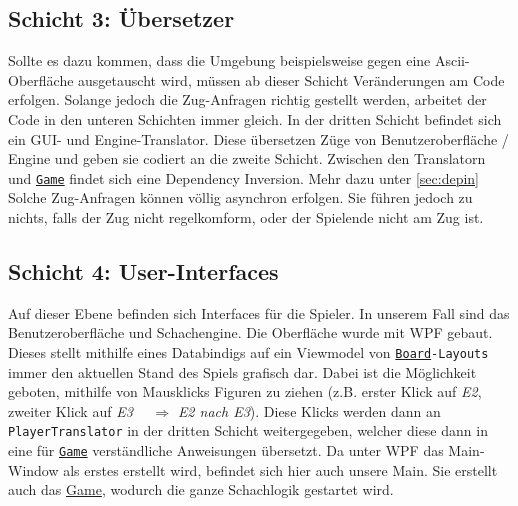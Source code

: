 \documentclass[
10pt, %
a4paper, %
oneside, %
headinclude,footinclude, %
BCOR5mm, %
]{scrartcl}
\begin{document}
\begin{onehalfspace}
\subsection{Schicht 3: Übersetzer}
Sollte es dazu kommen, dass die Umgebung beispielsweise gegen eine Ascii-Oberfläche ausgetauscht wird, müssen ab dieser Schicht Veränderungen am Code erfolgen. Solange jedoch die Zug-Anfragen richtig gestellt werden, arbeitet der Code in den unteren Schichten immer gleich. In der dritten Schicht befindet sich ein GUI- und Engine-Translator. Diese übersetzen Züge von Benutzeroberfläche / Engine und geben sie codiert an die zweite Schicht. Zwischen den Translatorn und \texttt{\href{https://github.com/schmida736/Chess-AdvancedSE/blob/main/Chess-AdvancedSE/Game\%20Elements/Game.cs}{Game}} findet sich eine Dependency Inversion. Mehr dazu unter \autoref{sec:depin}
Solche Zug-Anfragen können völlig asynchron erfolgen. Sie führen jedoch zu nichts, falls der Zug nicht regelkomform, oder der Spielende nicht am Zug ist.
\subsection{Schicht 4: User-Interfaces}
Auf dieser Ebene befinden sich Interfaces für die Spieler. In unserem Fall sind das Benutzeroberfläche und Schachengine. Die Oberfläche wurde mit WPF gebaut. Dieses stellt mithilfe eines Databindigs auf ein Viewmodel von \texttt{\href{https://github.com/schmida736/Chess-AdvancedSE/blob/main/Chess-AdvancedSE/Game\%20Elements/Board.cs}{Board}-Layouts} immer den aktuellen Stand des Spiels grafisch dar. 
Dabei ist die Möglichkeit geboten, mithilfe von Mausklicks Figuren zu ziehen (z.B. erster Klick auf \textit{E2}, zweiter Klick auf \textit{E3}~~ $\Rightarrow$ \textit{E2 nach E3}). Diese Klicks werden dann an \texttt{PlayerTranslator} in der dritten Schicht weitergegeben, welcher diese dann in eine für \texttt{\href{https://github.com/schmida736/Chess-AdvancedSE/blob/main/Chess-AdvancedSE/Game\%20Elements/Game.cs}{Game}} verständliche Anweisungen übersetzt.
Da unter WPF das Main-Window als erstes erstellt wird, befindet sich hier auch unsere Main. Sie erstellt auch das \href{https://github.com/schmida736/Chess-AdvancedSE/blob/main/Chess-AdvancedSE/Game\%20Elements/Game.cs}{Game}, wodurch die ganze Schachlogik gestartet wird.


\end{onehalfspace}
\end{document}
